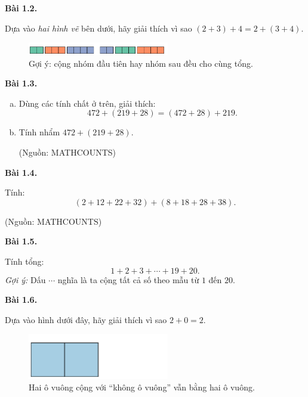 \documentclass[12pt,a4paper]{book}
\newenvironment{problem}[1][]{
  \par\noindent\textbf{Bài #1.}\ \ignorespaces
}{\par}
\begin{document}
\begin{problem}[1.2]
Dựa vào \emph{hai hình vẽ} bên dưới, hãy giải thích vì sao
$(2+3)+4=2+(3+4)$.

\begin{figure}[h!]
  \centering
  \includegraphics[width=0.55\textwidth]{img/fig-prob1.2.pdf}
  \caption*{\small Gợi ý: cộng nhóm đầu tiên hay nhóm sau đều cho cùng tổng.}
\end{figure}
\end{problem}

\begin{problem}[1.3]
\begin{enumerate}[(a)]
  \item Dùng các tính chất ở trên, giải thích:
  \[
  472+(219+28)=(472+28)+219.
  \]
  \item Tính nhẩm $472+(219+28)$.
  \begin{flushright}\small(Nguồn: MATHCOUNTS)\end{flushright}
\end{enumerate}
\end{problem}

\begin{problem}[1.4]
Tính:
\[
(2+12+22+32)+(8+18+28+38).
\]
\begin{flushright}\small(Nguồn: MATHCOUNTS)\end{flushright}
\end{problem}

\begin{problem}[1.5]
Tính tổng:
\[
1+2+3+\cdots+19+20.
\]
\textit{Gợi ý:} Dấu \texttt{$\cdots$} nghĩa là ta cộng tất cả số theo
mẫu từ $1$ đến $20$.
\end{problem}


\begin{problem}[1.6]
Dựa vào hình dưới đây, hãy giải thích vì sao $2 + 0 = 2$.

\begin{figure}[h!]
  \centering
  \includegraphics[width=0.55\textwidth]{img/fig-prob1.6.pdf}
  \caption*{\small Hai ô vuông cộng với “không ô vuông” vẫn bằng hai ô vuông.}
\end{figure}
\end{problem}
\end{document}
